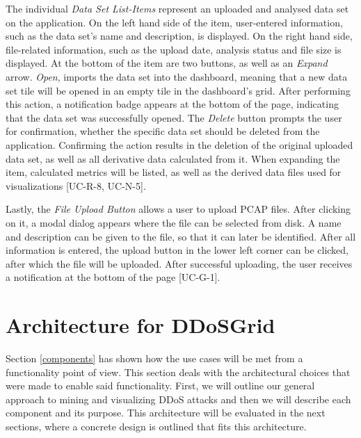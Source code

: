 The individual \emph{Data Set List-Items} represent an uploaded and analysed data set on the application. On the left hand side of the item, user-entered information, such as the data set's name and description, is displayed. On the right hand side, file-related information, such as the upload date, analysis status and file size is displayed. At the bottom of the item are two buttons, as well as an \emph{Expand} arrow. \emph{Open}, imports the data set into the dashboard, meaning that a new data set tile will be opened in an empty tile in the dashboard's grid. After performing this action, a notification badge appears at the bottom of the page, indicating that the data set was successfully opened. The \emph{Delete} button prompts the user for confirmation, whether the specific data set should be deleted from the application. Confirming the action results in the deletion of the original uploaded data set, as well as all derivative data calculated from it. When expanding the item, calculated metrics will be listed, as well as the derived data files used for visualizations [UC-R-8, UC-N-5].

Lastly, the \emph{File Upload Button} allows a user to upload PCAP files. After clicking on it, a modal dialog appears where the file can be selected from disk. A name and description can be given to the file, so that it can later be identified. After all information is entered, the upload button in the lower left corner can be clicked, after which the file will be uploaded. After successful uploading, the user receives a notification at the bottom of the page [UC-G-1].

\section{Architecture for DDoSGrid}
Section \ref{components} has shown how the use cases will be met from a functionality point of view. This section deals with the architectural choices that were made to enable said functionality. First, we will outline our general approach to mining and visualizing DDoS attacks and then we will describe each component and its purpose. This architecture will be evaluated in the next sections, where a concrete design is outlined that fits this architecture.

